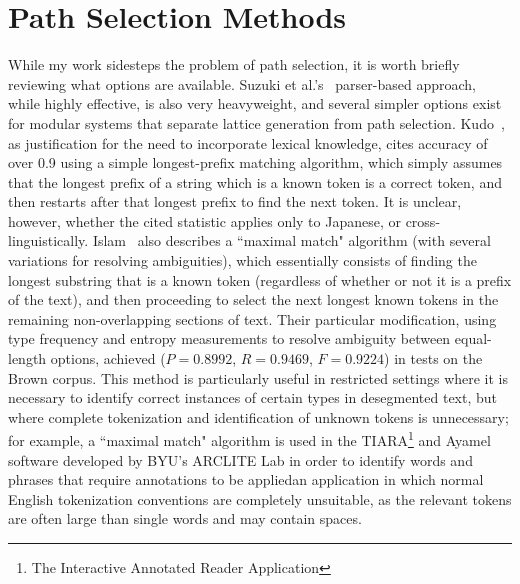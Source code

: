 \section{Path Selection Methods}
While my work sidesteps the problem of path selection, it is worth briefly reviewing what options are available. Suzuki et al.'s~\cite{suzuki00} parser-based approach, while highly effective, is also very heavyweight, and several simpler options exist for modular systems that separate lattice generation from path selection. Kudo~\cite{kudo04}, as justification for the need to incorporate lexical knowledge, cites accuracy of over 0.9 using a simple longest-prefix matching algorithm, which simply assumes that the longest prefix of a string which is a known token is a correct token, and then restarts after that longest prefix to find the next token. It is unclear, however, whether the cited statistic applies only to Japanese, or cross-linguistically. Islam~\cite{islam07} also describes a ``maximal match" algorithm (with several variations for resolving ambiguities), which essentially consists of finding the longest substring that is a known token (regardless of whether or not it is a prefix of the text), and then proceeding to select the next longest known tokens in the remaining non-overlapping sections of text. Their particular modification, using type frequency and entropy measurements to resolve ambiguity between equal-length options, achieved ($P = 0.8992$, $R = 0.9469$, $F = 0.9224$) in tests on the Brown corpus. This method is particularly useful in restricted settings where it is necessary to identify correct instances of certain types in desegmented text, but where complete tokenization and identification of unknown tokens is unnecessary; for example, a ``maximal match" algorithm is used in the TIARA\footnote{The Interactive Annotated Reader Application} \cite{cloe12} and Ayamel \cite{todd14} software developed by BYU's ARCLITE Lab in order to identify words and phrases that require annotations to be applied\textemdash an application in which normal English tokenization conventions are completely unsuitable, as the relevant tokens are often large than single words and may contain spaces.
